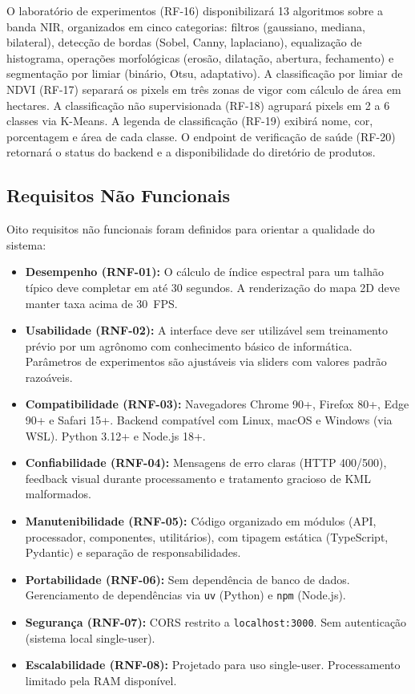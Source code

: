 \documentclass[12pt, a4paper]{article}
\begin{document}
O laboratório de experimentos (RF-16) disponibilizará 13 algoritmos sobre a banda NIR, organizados em cinco categorias: filtros (gaussiano, mediana, bilateral), detecção de bordas (Sobel, Canny, laplaciano), equalização de histograma, operações morfológicas (erosão, dilatação, abertura, fechamento) e segmentação por limiar (binário, Otsu, adaptativo). A classificação por limiar de NDVI (RF-17) separará os pixels em três zonas de vigor com cálculo de área em hectares. A classificação não supervisionada (RF-18) agrupará pixels em 2 a 6 classes via K-Means. A legenda de classificação (RF-19) exibirá nome, cor, porcentagem e área de cada classe. O endpoint de verificação de saúde (RF-20) retornará o status do backend e a disponibilidade do diretório de produtos.

\subsection{Requisitos Não Funcionais}

Oito requisitos não funcionais foram definidos para orientar a qualidade do sistema:

\begin{itemize}
  \item \textbf{Desempenho (RNF-01):} O cálculo de índice espectral para um talhão típico deve completar em até 30 segundos. A renderização do mapa 2D deve manter taxa acima de 30~FPS.
  \item \textbf{Usabilidade (RNF-02):} A interface deve ser utilizável sem treinamento prévio por um agrônomo com conhecimento básico de informática. Parâmetros de experimentos são ajustáveis via sliders com valores padrão razoáveis.
  \item \textbf{Compatibilidade (RNF-03):} Navegadores Chrome 90+, Firefox 80+, Edge 90+ e Safari 15+. Backend compatível com Linux, macOS e Windows (via WSL). Python 3.12+ e Node.js 18+.
  \item \textbf{Confiabilidade (RNF-04):} Mensagens de erro claras (HTTP 400/500), feedback visual durante processamento e tratamento gracioso de KML malformados.
  \item \textbf{Manutenibilidade (RNF-05):} Código organizado em módulos (API, processador, componentes, utilitários), com tipagem estática (TypeScript, Pydantic) e separação de responsabilidades.
  \item \textbf{Portabilidade (RNF-06):} Sem dependência de banco de dados. Gerenciamento de dependências via \texttt{uv} (Python) e \texttt{npm} (Node.js).
  \item \textbf{Segurança (RNF-07):} CORS restrito a \texttt{localhost:3000}. Sem autenticação (sistema local single-user).
  \item \textbf{Escalabilidade (RNF-08):} Projetado para uso single-user. Processamento limitado pela RAM disponível.
\end{itemize}
\end{document}
